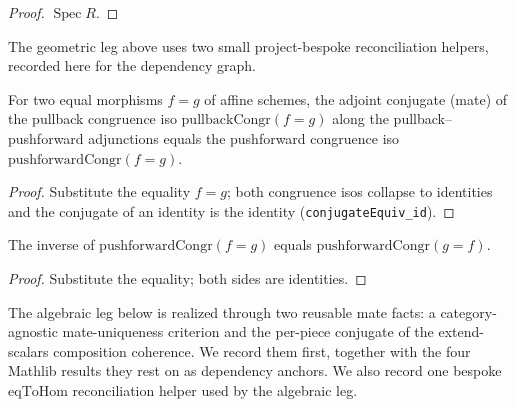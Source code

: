 \begin{lemma}
\begin{proof}
    \(\operatorname{Spec} R\).
  \end{proof}
\end{lemma}

The geometric leg above uses two small project-bespoke reconciliation helpers, recorded here
for the dependency graph.

\begin{lemma}
  \label{lem:conjugateEquiv_pullbackCongr}
  For two equal morphisms \(f = g\) of affine schemes, the adjoint conjugate (mate) of the pullback
  congruence iso \(\mathrm{pullbackCongr}(f=g)\) along the pullback--pushforward adjunctions equals the
  pushforward congruence iso \(\mathrm{pushforwardCongr}(f=g)\).
  \begin{proof}
    Substitute the equality \(f = g\); both congruence isos collapse to identities and the conjugate of
    an identity is the identity (\texttt{conjugateEquiv\_id}).
  \end{proof}
\end{lemma}

\begin{lemma}
  \label{lem:pushforwardCongr_inv_eq}
  The inverse of \(\mathrm{pushforwardCongr}(f=g)\) equals \(\mathrm{pushforwardCongr}(g=f)\).
  \begin{proof}
    Substitute the equality; both sides are identities.
  \end{proof}
\end{lemma}

The algebraic leg below is realized through two reusable mate facts: a
category-agnostic mate-uniqueness criterion and the per-piece conjugate of the
extend-scalars composition coherence. We record them first, together with the four
Mathlib results they rest on as dependency anchors. We also record one bespoke
\(\mathrm{eqToHom}\) reconciliation helper used by the algebraic leg.

